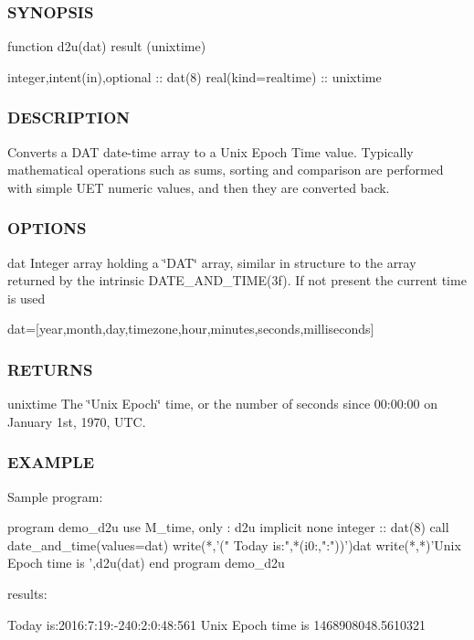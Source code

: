 \subsubsection*{S\+Y\+N\+O\+P\+S\+IS}

\begin{DoxyVerb}function d2u(dat) result (unixtime)

   integer,intent(in),optional :: dat(8)
   real(kind=realtime)         :: unixtime
\end{DoxyVerb}


\subsubsection*{D\+E\+S\+C\+R\+I\+P\+T\+I\+ON}

Converts a D\+AT date-\/time array to a Unix Epoch Time value. Typically mathematical operations such as sums, sorting and comparison are performed with simple U\+ET numeric values, and then they are converted back.

\subsubsection*{O\+P\+T\+I\+O\+NS}

dat Integer array holding a \char`\"{}\+D\+A\+T\char`\"{} array, similar in structure to the array returned by the intrinsic D\+A\+T\+E\+\_\+\+A\+N\+D\+\_\+\+T\+I\+M\+E(3f). If not present the current time is used

dat=\mbox{[}year,month,day,timezone,hour,minutes,seconds,milliseconds\mbox{]}

\subsubsection*{R\+E\+T\+U\+R\+NS}

unixtime The \char`\"{}\+Unix Epoch\char`\"{} time, or the number of seconds since 00\+:00\+:00 on January 1st, 1970, U\+TC.

\subsubsection*{E\+X\+A\+M\+P\+LE}

\begin{DoxyVerb}Sample program:

 program demo_d2u
 use M_time, only : d2u
 implicit none
 integer           :: dat(8)
    call date_and_time(values=dat)
    write(*,'(" Today is:",*(i0:,":"))')dat
    write(*,*)'Unix Epoch time is ',d2u(dat)
 end program demo_d2u

results:

 Today is:2016:7:19:-240:2:0:48:561
 Unix Epoch time is    1468908048.5610321
\end{DoxyVerb}

